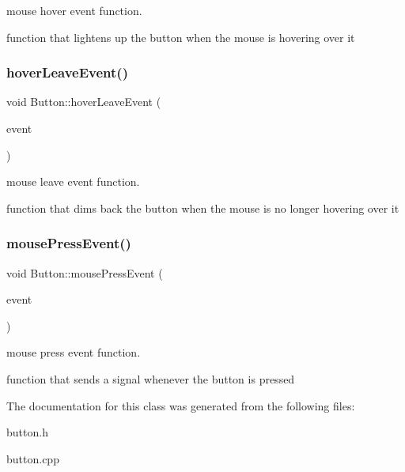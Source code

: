 mouse hover event function. 

function that lightens up the button when the mouse is hovering over it \mbox{\label{classButton_a1689a97690d9469ce8350d24db0d7485}} 
\subsubsection{\texorpdfstring{hover\+Leave\+Event()}{hoverLeaveEvent()}}
{\footnotesize\ttfamily void Button\+::hover\+Leave\+Event (\begin{DoxyParamCaption}\item[{Q\+Graphics\+Scene\+Hover\+Event $\ast$}]{event }\end{DoxyParamCaption})}



mouse leave event function. 

function that dims back the button when the mouse is no longer hovering over it \mbox{\label{classButton_a17d8eb0c904605b223bbc00c75655315}} 
\subsubsection{\texorpdfstring{mouse\+Press\+Event()}{mousePressEvent()}}
{\footnotesize\ttfamily void Button\+::mouse\+Press\+Event (\begin{DoxyParamCaption}\item[{Q\+Graphics\+Scene\+Mouse\+Event $\ast$}]{event }\end{DoxyParamCaption})}



mouse press event function. 

function that sends a signal whenever the button is pressed 

The documentation for this class was generated from the following files\+:\begin{DoxyCompactItemize}
\item 
button.\+h\item 
button.\+cpp\end{DoxyCompactItemize}
